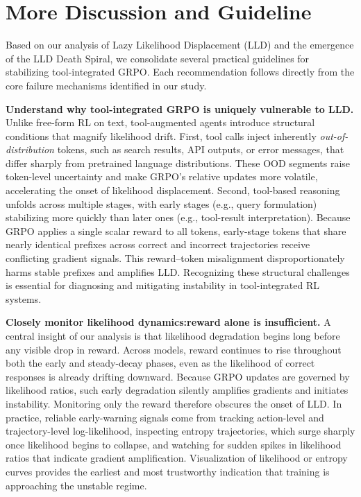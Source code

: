 \section{More Discussion and Guideline}\label{sec:discuss}
Based on our analysis of Lazy Likelihood Displacement (LLD) and the emergence of the LLD Death Spiral, we consolidate several practical guidelines for stabilizing tool-integrated GRPO. Each recommendation follows directly from the core failure mechanisms identified in our study.

\textbf{Understand why tool-integrated GRPO is uniquely vulnerable to LLD.}
Unlike free-form RL on text, tool-augmented agents introduce structural conditions that magnify likelihood drift. First, tool calls inject inherently \emph{out-of-distribution} tokens, such as search results, API outputs, or error messages, that differ sharply from pretrained language distributions. These OOD segments raise token-level uncertainty and make GRPO's relative updates more volatile, accelerating the onset of likelihood displacement. Second, tool-based reasoning unfolds across multiple stages, with early stages (e.g., query formulation) stabilizing more quickly than later ones (e.g., tool-result interpretation). Because GRPO applies a single scalar reward to all tokens, early-stage tokens that share nearly identical prefixes across correct and incorrect trajectories receive conflicting gradient signals. This reward–token misalignment disproportionately harms stable prefixes and amplifies LLD. Recognizing these structural challenges is essential for diagnosing and mitigating instability in tool-integrated RL systems.

\textbf{Closely monitor likelihood dynamics:reward alone is insufficient.} A central insight of our analysis is that likelihood degradation begins long before any visible drop in reward. Across models, reward continues to rise throughout both the early and steady-decay phases, even as the likelihood of correct responses is already drifting downward. Because GRPO updates are governed by likelihood ratios, such early degradation silently amplifies gradients and initiates instability. Monitoring only the reward therefore obscures the onset of LLD. In practice, reliable early-warning signals come from tracking action-level and trajectory-level log-likelihood, inspecting entropy trajectories, which surge sharply once likelihood begins to collapse, and watching for sudden spikes in likelihood ratios that indicate gradient amplification. Visualization of likelihood or entropy curves provides the earliest and most trustworthy indication that training is approaching the unstable regime.

